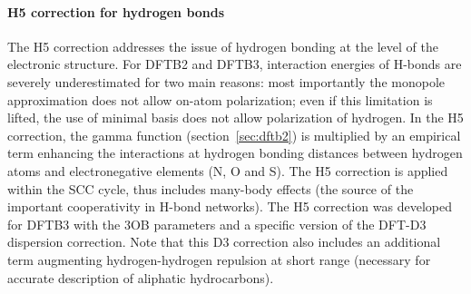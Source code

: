 \documentclass[reprint,onecolumn,superscriptaddress]{revtex4-1}
\begin{document}
\paragraph{H5 correction for hydrogen bonds}

The H5 correction\cite{rezac2017} addresses the issue of hydrogen bonding at
the level of the electronic structure.  For DFTB2 and DFTB3, interaction
energies of H-bonds are severely underestimated for two main reasons: most
importantly the monopole approximation does not allow on-atom polarization; even
if this limitation is lifted, the use of minimal basis does not allow
polarization of hydrogen.  In the H5 correction, the gamma function
(section~\ref{sec:dftb2}) is multiplied by an empirical term enhancing the
interactions at hydrogen bonding distances between hydrogen atoms and
electronegative elements (N, O and S). The H5 correction is applied within the
SCC cycle, thus includes many-body effects (the source of the important
cooperativity in H-bond networks).
The H5 correction was developed for DFTB3 with the 3OB parameters and a specific
version of the DFT-D3\cite{grimme2010,grimme2011} dispersion correction. Note
that this D3 correction also includes an additional term augmenting
hydrogen-hydrogen repulsion at short range (necessary for accurate description
of aliphatic hydrocarbons\cite{rezac_2012,vorlova_2015}).
\end{document}
